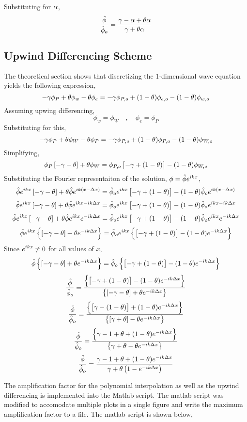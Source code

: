 \documentclass[class=report, 12pt, crop=false]{standalone}
\begin{document}
\begin{center}
Substituting for $\alpha$,
$$\frac{\hat{\phi}}{\hat{\phi}_o} = \frac{\gamma - \alpha + \theta\alpha}{\gamma + \theta\alpha}$$


\subsection{Upwind Differencing Scheme}
The theoretical section shows that discretizing the $1$-dimensional wave equation yields the following expression,
$$-\gamma\phi_{P} + \theta\phi_{w} - \theta\phi_{e} = - \gamma\phi_{P,o} + (1-\theta)\phi_{e,o} - (1-\theta)\phi_{w,o}$$
Assuming upwing differencing,
$$\phi_{w} = \phi_{W} \quad,\quad \phi_{e} = \phi_{P}$$
Substituting for this,
$$-\gamma\phi_{P} + \theta\phi_{W} - \theta\phi_{P} = - \gamma\phi_{P,o} + (1-\theta)\phi_{P,o} - (1-\theta)\phi_{W,o}$$
Simplifying,
$$\phi_{P}\left[-\gamma - \theta\right] + \theta\phi_{W} = \phi_{P,o}\left[-\gamma + (1-\theta)\right] - (1-\theta)\phi_{W,o}$$
Substituting the Fourier representaiton of the solution, $\phi = \hat{\phi}e^{ikx}$,
$$\hat{\phi}e^{ikx}\left[-\gamma - \theta\right] + \theta\hat{\phi}e^{ik(x-\Delta x)} = \hat{\phi}_{o}e^{ikx}\left[-\gamma + (1-\theta)\right] - (1-\theta)\hat{\phi}_{o}e^{ik(x-\Delta x)}$$
$$\hat{\phi}e^{ikx}\left[-\gamma - \theta\right] + \theta\hat{\phi}e^{ikx-ik\Delta x} = \hat{\phi}_{o}e^{ikx}\left[-\gamma + (1-\theta)\right] - (1-\theta)\hat{\phi}_{o}e^{ikx-ik\Delta x}$$
$$\hat{\phi}e^{ikx}\left[-\gamma - \theta\right] + \theta\hat{\phi}e^{ikx}e^{-ik\Delta x} = \hat{\phi}_{o}e^{ikx}\left[-\gamma + (1-\theta)\right] - (1-\theta)\hat{\phi}_{o}e^{ikx}e^{-ik\Delta x}$$
$$\hat{\phi}e^{ikx}\left\{\left[-\gamma - \theta\right] + \theta e^{-ik\Delta x}\right\} = \hat{\phi}_{o}e^{ikx}\left\{\left[-\gamma + (1-\theta)\right] - (1-\theta)e^{-ik\Delta x}\right\}$$
Since $\displaystyle{e^{ikx} \neq 0}$ for all values of $x$,
$$\hat{\phi}\left\{\left[-\gamma - \theta\right] + \theta e^{-ik\Delta x}\right\} = \hat{\phi}_{o}\left\{\left[-\gamma + (1-\theta)\right] - (1-\theta)e^{-ik\Delta x}\right\}$$
$$\frac{\hat{\phi}}{\hat{\phi}_{o}} = \frac{\left\{\left[-\gamma + (1-\theta)\right] - (1-\theta)e^{-ik\Delta x}\right\}}{\left\{\left[-\gamma - \theta\right] + \theta e^{-ik\Delta x}\right\}}$$
$$\frac{\hat{\phi}}{\hat{\phi}_{o}} = \frac{\left\{\left[\gamma - (1-\theta)\right] + (1-\theta)e^{-ik\Delta x}\right\}}{\left\{\left[\gamma + \theta\right] - \theta e^{-ik\Delta x}\right\}}$$
$$\frac{\hat{\phi}}{\hat{\phi}_{o}} = \frac{\left\{\gamma - 1 + \theta + (1-\theta)e^{-ik\Delta x}\right\}}{\left\{\gamma + \theta - \theta e^{-ik\Delta x}\right\}}$$
$$\frac{\hat{\phi}}{\hat{\phi}_{o}} = \frac{\gamma - 1 + \theta + (1-\theta)e^{-ik\Delta x}}{\gamma + \theta\left(1 - e^{-ik\Delta x}\right)}$$

The amplification factor for the polynomial interpolation as well as the upwind differencing is implemented into the Matlab script. The matlab script was modified to accomodate multiple plots in a single figure and write the maximum amplification factor to a file. The matlab script is shown below,



\end{center}
\end{document}

